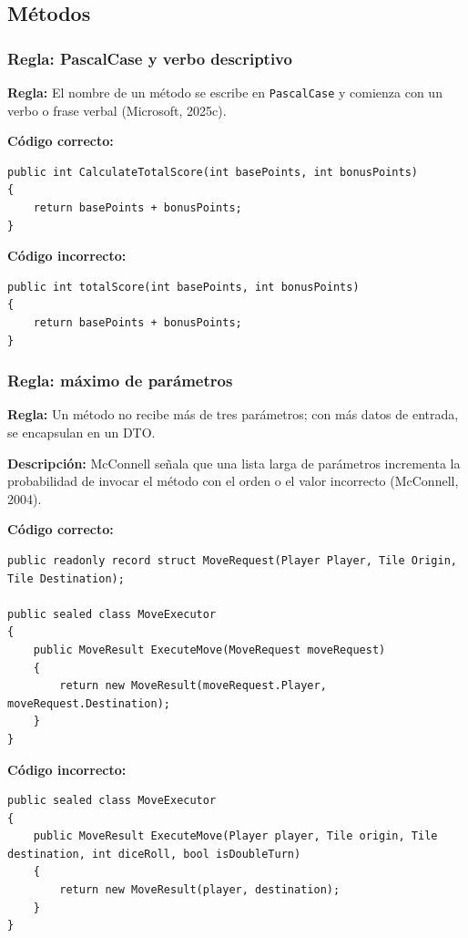 \subsection{Métodos}

\subsubsection{Regla: PascalCase y verbo descriptivo}

\textbf{Regla:} El nombre de un método se escribe en \texttt{PascalCase} y comienza con un verbo o frase verbal (Microsoft, 2025c).

\textbf{Código correcto:}
\begin{lstlisting}[style=csharpstyle]
public int CalculateTotalScore(int basePoints, int bonusPoints)
{
    return basePoints + bonusPoints;
}
\end{lstlisting}

\textbf{Código incorrecto:}
\begin{lstlisting}[style=csharpstyle]
public int totalScore(int basePoints, int bonusPoints)
{
    return basePoints + bonusPoints;
}
\end{lstlisting}

\subsubsection{Regla: máximo de parámetros}

\textbf{Regla:} Un método no recibe más de tres parámetros; con más datos de entrada, se encapsulan en un DTO.

\textbf{Descripción:} McConnell señala que una lista larga de parámetros incrementa la probabilidad de invocar el método con el orden o el valor incorrecto (McConnell, 2004).

\textbf{Código correcto:}
\begin{lstlisting}[style=csharpstyle]
public readonly record struct MoveRequest(Player Player, Tile Origin, Tile Destination);

public sealed class MoveExecutor
{
    public MoveResult ExecuteMove(MoveRequest moveRequest)
    {
        return new MoveResult(moveRequest.Player, moveRequest.Destination);
    }
}
\end{lstlisting}

\textbf{Código incorrecto:}
\begin{lstlisting}[style=csharpstyle]
public sealed class MoveExecutor
{
    public MoveResult ExecuteMove(Player player, Tile origin, Tile destination, int diceRoll, bool isDoubleTurn)
    {
        return new MoveResult(player, destination);
    }
}
\end{lstlisting}

